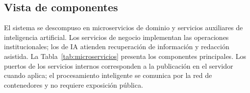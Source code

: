 	\subsection{Vista de componentes}
	El sistema se descompuso en microservicios de dominio y servicios auxiliares de inteligencia
	artificial. Los servicios de negocio implementan las operaciones institucionales; los de IA
	atienden recuperación de información y redacción asistida. La
	Tabla~\ref{tab:microservicios} presenta los componentes principales. Los puertos de los
	servicios internos corresponden a la publicación en el servidor cuando aplica; el
	procesamiento inteligente se comunica por la red de contenedores y no requiere exposición pública.
	
	
	\small
	\renewcommand{\arraystretch}{1.25}
	\setlength{\tabcolsep}{4pt}
	
